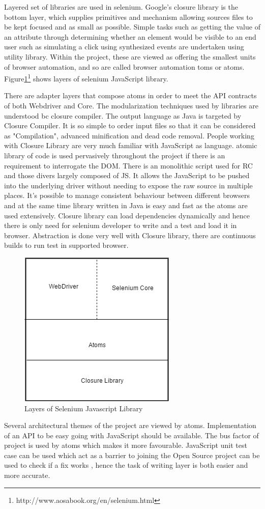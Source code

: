 \documentclass[article,type=msc,colorback,accentcolor=tud9c,twoside,11pt]{tudthesis}
\begin{document}
	Layered set of libraries are used in selenium. Google's closure library is the bottom layer, which supplies primitives and mechanism allowing sources files to be kept focused and as small as possible. Simple tasks such as getting the value of an attribute through determining whether an element would be visible to an end user such as simulating a click using synthesized events are undertaken using utility library. Within the project, these are viewed as offering the smallest units of browser automation, and so are called browser automation toms or atoms. 
	Figure\ref{fig:LayersofSeleniumJSLibrary}\footnote{http://www.aosabook.org/en/selenium.html} shows layers of selenium JavaScript library.
	
	There are adapter layers that compose atoms in order to meet the API contracts of both Webdriver and Core. The modularization techniques used by libraries are understood bc closure compiler. The output language as Java is targeted by Closure Compiler. It is so simple to order input files so that it can be considered as "Compilation", advanced minification and dead code removal. People working with Closure Library are very much familiar with JavaScript as language. atomic library of code is used pervasively throughout the project if there is an requirement to interrogate the DOM. There is an monolithic script used for RC and those divers largely composed of JS. It allows the JavaScript to be pushed into the underlying driver without needing to expose the raw source in multiple places. It's possible to manage consistent behaviour between different browsers and at the same time library written in Java is easy and fast as the atoms are used extensively. Closure library can load dependencies dynamically and hence there is only need for selenium developer to write and a test and load it in browser. Abstraction is done very well with Closure library, there are continuous builds to run test in supported browser.
	\begin{figure}[h]
		\centering
		\includegraphics[scale=0.6]{LayersofSeleniumJSLibrary}
		\caption{Layers of Selenium Javascript Library}
		\label{fig:LayersofSeleniumJSLibrary}
	\end{figure}
	Several architectural themes of the project are viewed by atoms. Implementation of an API to be easy going with JavaScript should be available. The bus factor of project is used by atoms which makes it more favourable. JavaScript unit test case can be used which act as a barrier to joining the Open Source project can be used to check if a fix works , hence the task of writing layer is both easier and more accurate.
\end{document}
